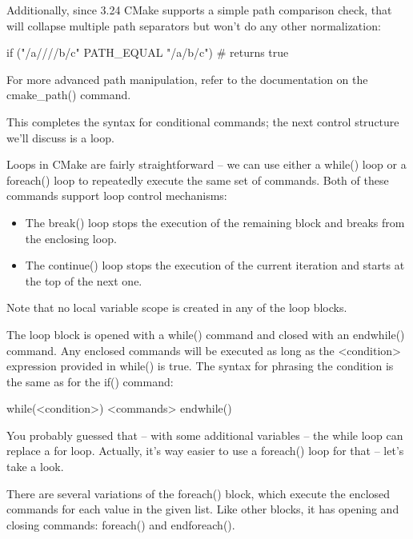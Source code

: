 Additionally, since 3.24 CMake supports a simple path comparison check, that will collapse multiple path separators but won’t do any other normalization:

\begin{cmake}
if ("/a////b/c" PATH_EQUAL "/a/b/c") # returns true
\end{cmake}

For more advanced path manipulation, refer to the documentation on the cmake\_path() command.

This completes the syntax for conditional commands; the next control structure we’ll discuss is a loop.


Loops in CMake are fairly straightforward – we can use either a while() loop or a foreach() loop to repeatedly execute the same set of commands. Both of these commands support loop control mechanisms:

\begin{itemize}
\item
The break() loop stops the execution of the remaining block and breaks from the enclosing loop.

\item
The continue() loop stops the execution of the current iteration and starts at the top of the next one.
\end{itemize}

Note that no local variable scope is created in any of the loop blocks.


The loop block is opened with a while() command and closed with an endwhile() command. Any enclosed commands will be executed as long as the <condition> expression provided in while() is true. The syntax for phrasing the condition is the same as for the if() command:

\begin{shell}
while(<condition>)
    <commands>
endwhile()
\end{shell}

You probably guessed that – with some additional variables – the while loop can replace a for loop. Actually, it’s way easier to use a foreach() loop for that – let’s take a look.


There are several variations of the foreach() block, which execute the enclosed commands for each value in the given list. Like other blocks, it has opening and closing commands: foreach() and endforeach().

